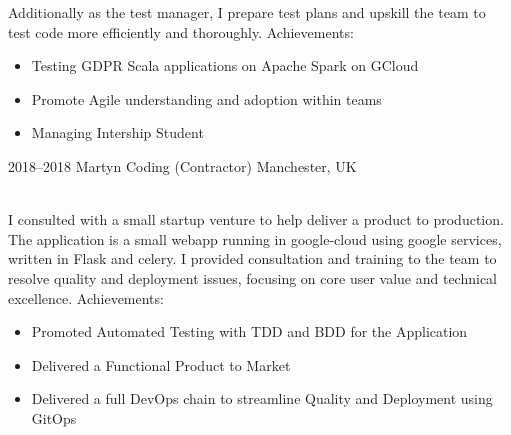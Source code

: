 \documentclass[]{cv-style}          %
\begin{document}
\begin{entrylist}
{  Additionally as the test manager, I prepare test plans and upskill the team to test code more efficiently and thoroughly.
  Achievements:
  \begin{itemize}
    \item Testing GDPR Scala applications on Apache Spark on GCloud
    \item Promote Agile understanding and adoption within teams
    \item Managing Intership Student
  \end{itemize}
}
\entry
{2018--2018}
{Martyn Coding (Contractor)}
{Manchester, UK}
{\\
I consulted with a small startup venture to help deliver a product to production.
The application is a small webapp running in google-cloud using google services, written in Flask and celery.
I provided consultation and training to the team to resolve quality and deployment issues, focusing on core user value and technical excellence.
Achievements:
\begin{itemize}
  \item Promoted Automated Testing with TDD and BDD for the Application
  \item Delivered a Functional Product to Market
  \item Delivered a full DevOps chain to streamline Quality and Deployment using GitOps
\end{itemize}
}
\end{entrylist}
\end{document}
